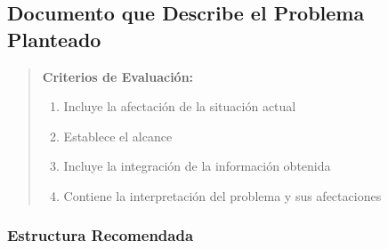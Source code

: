 \documentclass[12pt,letterpaper,oneside]{book}
\newenvironment{criterios}
{\begin{quote}\textbf{Criterios de Evaluación:}\begin{enumerate}}
{\end{enumerate}\end{quote}}
\begin{document}
\subsection{Documento que Describe el Problema Planteado}

\begin{criterios}
\item Incluye la afectación de la situación actual
\item Establece el alcance
\item Incluye la integración de la información obtenida
\item Contiene la interpretación del problema y sus afectaciones
\end{criterios}

\subsubsection{Estructura Recomendada}
\end{document}
